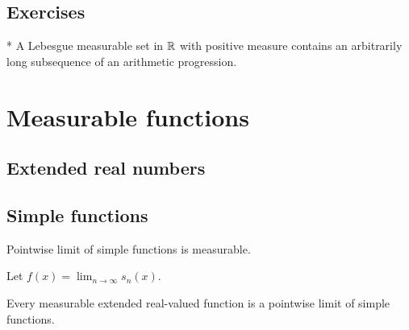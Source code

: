 \documentclass{../note}
\begin{document}
\section*{Exercises}

\begin{prb}
\end{prb}
\begin{prb}*
A Lebesgue measurable set in $\mathbb{R}$ with positive measure contains an arbitrarily long subsequence of an arithmetic progression.
\end{prb}

















\chapter{Measurable functions}

\section{Extended real numbers}


\section{Simple functions}
Pointwise limit of simple functions is measurable.
\begin{pf}
Let $f(x)=\lim_{n\to\infty}s_n(x)$.

\end{pf}

Every measurable extended real-valued function is a pointwise limit of simple functions.
\end{document}
